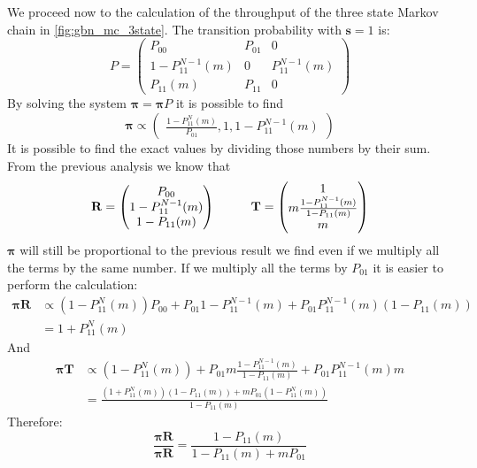 We proceed now to the calculation of the throughput of the three state Markov chain in \autoref{fig:gbn_mc_3state}. The transition probability with $\mathbf{s} = 1$ is:
$$P=
\begin{pmatrix}
		P_{00} & P_{01} & 0 \\
		1-P_{11}^{N-1}(m) & 0 & P_{11}^{N-1}(m) \\
		P_{11}(m) & P_{11} & 0
\end{pmatrix} $$
By solving the system $\mathbf{\pi} = \mathbf{\pi}P$ it is possible to find
$$
	\mathbf{\pi} \propto
	\begin{pmatrix}
		\frac{1-P_{11}^N(m)}{P_{01}} , 1 , 1-P_{11}^{N-1}(m)
	\end{pmatrix}
$$
It is  possible to find the exact values by dividing those numbers by their sum. From the previous analysis we know that
$$\mathbf{R} =
\begin{pmatrix}
		P_{00}\\
	  1-P_{11}^{N-1}(m) \\
		1-P_{11}(m)
\end{pmatrix} \hspace{1 cm}
\mathbf{T} =
\begin{pmatrix}
		1 \\
		m \frac{1-P_{11}^{N-1}(m)}{1-P_{11}(m)} \\
		m
\end{pmatrix} $$
$\mathbf{\pi}$ will still be proportional to the previous result we find even if we multiply all the  terms by the same number. If we multiply all the terms by $P_{01}$ it is easier to perform the calculation:
\begin{equation}
	\begin{split}
		\mathbf{\pi}\mathbf{R} &\propto  (1-P_{11}^N(m))P_{00} + P_{01}1-P_{11}^{N-1}(m) + P_{01}P_{11}^{N-1}(m)(1-P_{11}(m))\\
		&= 1 + P_{11}^N(m)
	\end{split}
\end{equation}
And
\begin{equation}
	\begin{split}
		\mathbf{\pi}\mathbf{T} &\propto (1-P_{11}^N(m)) + P_{01}m\frac{1-P_{11}^{N-1}(m)}{1-P_{11}(m)} + P_{01}P_{11}^{N-1}(m)m\\
		&=\frac{(1 + P_{11}^N(m))(1-P_{11}(m))+mP_{01}(1-P_{11}^N(m))}{1-P_{11}(m)}
	\end{split}
\end{equation}
Therefore:
\begin{equation}
		\frac{\mathbf{\pi}\mathbf{R}}{\mathbf{\pi}\mathbf{R}} = \frac{1-P_{11}(m)}{1-P_{11}(m)+ mP_{01}}
\end{equation}

